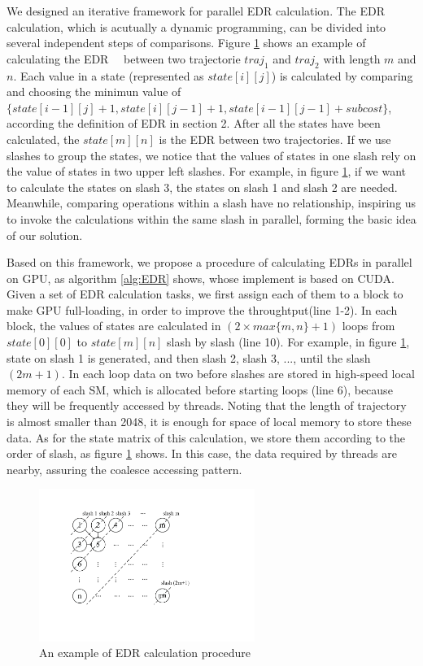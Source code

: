 \documentclass[conference]{IEEEtran}
\begin{document}
We designed an iterative framework for parallel EDR calculation. The EDR calculation, which is acutually a dynamic programming, can be divided into several independent steps of comparisons. Figure \ref{fig:DPstate} shows an example of calculating the EDR 　between two trajectorie $traj_1$ and $traj_2$ with length $m$ and $n$. Each value in a state (represented as $state[i][j]$) is calculated by comparing and choosing the minimun value of $\{state[i-1][j]+1,state[i][j-1]+1,state[i-1][j-1]+subcost\}$, according the definition of EDR in section 2. After all the states have been calculated, the $state[m][n]$ is the EDR between two trajectories. If we use slashes to group the states, we notice that the values of states in one slash rely on the value of states in two upper left slashes. For example, in figure \ref{fig:DPstate}, if we want to calculate the states on slash 3, the states on slash 1 and slash 2 are needed. Meanwhile, comparing operations within a slash have no relationship, inspiring us to invoke the calculations within the same slash in parallel, forming the basic idea of our solution.

Based on this framework, we propose a procedure of calculating EDRs in parallel on GPU, as algorithm \ref{alg:EDR} shows, whose implement is based on CUDA. Given a set of EDR calculation tasks, we first assign each of them to a block to make GPU full-loading, in order to improve the throughtput(line 1-2). In each block, the values of states are calculated in $(2\times max\{m,n\}+1)$ loops from $state[0][0]$ to $state[m][n]$ slash by slash (line 10). For example, in figure \ref{fig:DPstate}, state on slash 1 is generated, and then slash 2, slash 3, ..., until the slash $(2m+1)$. In each loop data on two before slashes are stored in high-speed local memory of each SM, which is allocated before starting loops (line 6), because they will be frequently accessed by threads. Noting that the length of trajectory is almost smaller than 2048, it is enough for space of local memory to store these data. As for the state matrix of this calculation, we store them according to the order of slash, as figure \ref{fig:DPstate} shows. In this case, the data required by threads are nearby, assuring the coalesce accessing pattern.


\begin{figure}[!t]\centering
	\includegraphics[width=7cm]{pdf/DPstate.pdf}
	\caption{An example of EDR calculation procedure\label{fig:DPstate}}
\end{figure}
\end{document}
